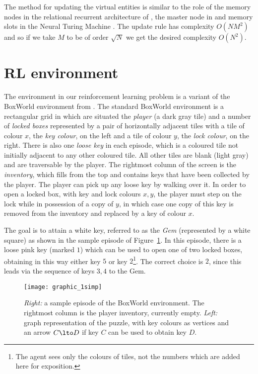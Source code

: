 \documentclass{article} %
\begin{document}
The method for updating the virtual entities is similar to the role of the memory nodes in the relational recurrent architecture of \citep{santoro_relational}, the master node in \citep[\S 5.2]{mpnn} and memory slots in the Neural Turing Machine \citep{ntm}. The update rule has complexity $O(NM^2)$ and so if we take $M$ to be of order $\sqrt{N}$ we get the desired complexity $O(N^2)$. 



\section{RL environment}
\label{rlenv}

The environment in our reinforcement learning problem is a variant of the BoxWorld environment from \citep{zambaldi}.  The standard BoxWorld environment is a rectangular grid in which are situated the \emph{player} (a dark gray tile) and a number of \emph{locked boxes} represented by a pair of horizontally adjacent tiles with a tile of colour $x$, the \emph{key colour}, on the left and a tile of colour $y$, the \emph{lock colour}, on the right. There is also one \emph{loose key} in each episode, which is a coloured tile not initially adjacent to any other coloured tile. All other tiles are blank (light gray) and are traversable by the player. The rightmost column of the screen is the \emph{inventory}, which fills from the top and contains keys that have been collected by the player. The player can pick up any loose key by walking over it.  In order to open a locked box, with key and lock colours $x,y$, the player must step on the lock while in possession of a copy of $y$, in which case one copy of this key is removed from the inventory and replaced by a key of colour $x$.  

The goal is to attain a white key, referred to as the \emph{Gem} (represented by a white square) as shown in the sample episode of Figure~\ref{figure:intro_proof}. In this episode, there is a loose pink key (marked $1$) which can be used to open one of two locked boxes, obtaining in this way either key $5$ or key $2$\footnote{The agent sees only the colours of tiles, not the numbers which are added here for exposition.}. The correct choice is $2$, since this leads via the sequence of keys $3,4$ to the Gem. 

\begin{figure}[h]
\begin{center}
\texttt{[image: graphic\_1simp]}
\end{center}
\caption{\emph{Right:} a sample episode of the BoxWorld environment. The rightmost column is the player inventory, currently empty. \emph{Left:} graph representation of the puzzle, with key colours as vertices and an arrow $C \lto D$ if key $C$ can be used to obtain key $D$.}
\label{figure:intro_proof}
\end{figure}
\end{document}
